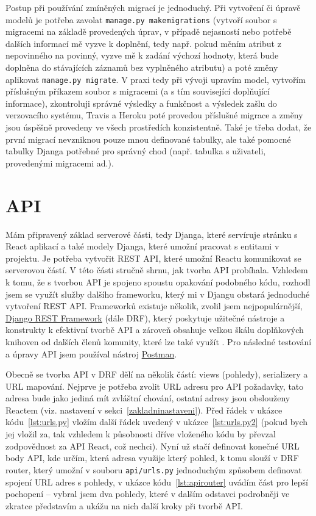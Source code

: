    Postup při používání zmíněných migrací je jednoduchý. Při vytvoření či úpravě modelů je potřeba zavolat \verb|manage.py makemigrations| (vytvoří soubor s migracemi na základě provedených úprav, v případě nejasností nebo potřebě dalších informací mě vyzve k doplnění, tedy např. pokud měním atribut z nepovinného na povinný, vyzve mě k zadání výchozí hodnoty, která bude doplněna do stávajících záznamů bez vyplněného atributu) a poté změny aplikovat \verb|manage.py migrate|. V praxi tedy při vývoji upravím model, vytvořím příslušným příkazem soubor s migracemi (a s tím související doplňující informace), zkontroluji správné výsledky a funkčnost a výsledek zašlu do verzovacího systému, Travis a Heroku poté provedou příslušné migrace a změny jsou úspěšně provedeny ve všech prostředích konzistentně. Také je třeba dodat, že první migrací nevzniknou pouze mnou definované tabulky, ale také pomocné tabulky Djanga potřebné pro správný chod (např. tabulka s uživateli, provedenými migracemi ad.).
    
    \section{API}\label{sec:api}
    Mám připravený základ serverové části, tedy Djanga, které servíruje stránku s React aplikací a také modely Djanga, které umožní pracovat s entitami v projektu. Je potřeba vytvořit REST API, které umožní Reactu komunikovat se serverovou částí. V této části stručně shrnu, jak tvorba API probíhala. Vzhledem k tomu, že s tvorbou API je spojeno spoustu opakování podobného kódu, rozhodl jsem se využít služby dalšího frameworku, který mi v Djangu obstará jednoduché vytvoření REST API. Frameworků existuje několik, zvolil jsem nejpopulárnější, \href{http://www.django-rest-framework.org/}{Django REST Framework} (dále DRF), který poskytuje užitečné nástroje a konstrukty k efektivní tvorbě API a zároveň obsahuje velkou škálu doplňkových knihoven od dalších členů komunity, které lze také využít \cite{drf2}. Pro následné testování a úpravy API jsem používal nástroj \href{https://www.getpostman.com/}{Postman}.
    
    Obecně se tvorba API v DRF dělí na několik částí: views (pohledy), serializery a URL mapování. Nejprve je potřeba zvolit URL adresu pro API požadavky, tato adresa bude jako jediná mít zvláštní chování, ostatní adresy jsou obslouženy Reactem (viz. nastavení v sekci~\ref{zakladninastaveni}). Před řádek v ukázce kódu~\ref{lst:urls.py} vložím další řádek uvedený v ukázce~\ref{lst:urls.py2} (pokud bych jej vložil za, tak vzhledem k působnosti dříve vloženého kódu by převzal zodpovědnost za API React, což nechci). Nyní už stačí definovat konečné URL body API, kde určím, která adresa využije který pohled, k tomu slouží v DRF router, který umožní v souboru \verb|api/urls.py| jednoduchým způsobem definovat spojení URL adres s pohledy, v ukázce kódu~\ref{lst:apirouter} uvádím část pro lepší pochopení -- vybral jsem dva pohledy, které v dalším odstavci podrobněji ve zkratce představím a ukážu na nich další kroky při tvorbě API.
    
